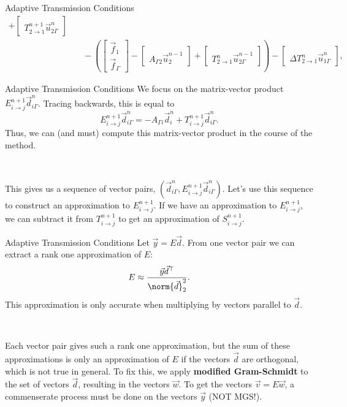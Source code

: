 \documentclass{beamer}
\begin{document}
\begin{frame}{Adaptive Transmission Conditions}
\begin{align*}
	+ \begin{bmatrix} ~ \\ T_{2 \to 1}^{n+1} \vec{u}_{2 \Gamma}^n \end{bmatrix} \\
	& \quad - \left ( \begin{bmatrix} \vec{f}_1 \\ \vec{f}_\Gamma \end{bmatrix}
	- \begin{bmatrix} ~ \\ A_{\Gamma 2} \vec{u}_2^{n-1} \end{bmatrix}
	+ \begin{bmatrix} ~ \\ T_{2 \to 1}^n \vec{u}_{2 \Gamma}^{n-1} \end{bmatrix} \right )
	- \begin{bmatrix} ~ \\ \Delta T_{2 \to 1}^n \vec{u}_{1 \Gamma}^{n} \end{bmatrix},
\end{align*}
\end{frame}

\begin{frame}{Adaptive Transmission Conditions}
We focus on the matrix-vector product $E_{i \to j}^{n+1} \vec{d}_{i \Gamma}^n$.
Tracing backwards, this is equal to
\begin{equation*}
	E_{i \to j}^{n+1} \vec{d}_{i \Gamma}^n = -A_{\Gamma i} \vec{d}_i^n + T_{i \to j}^{n+1} \vec{d}_{i \Gamma}^n.
\end{equation*}
Thus, we can (and must) compute this matrix-vector product in the course of the method.

~

This gives us a sequence of vector pairs, $(\vec{d}_{i \Gamma}^n, E_{i \to j}^{n+1} \vec{d}_{i \Gamma}^n)$.
Let's use this sequence to construct an approximation to $E_{i \to j}^{n+1}$.
If we have an approximation to $E_{i \to j}^{n+1}$, we can subtract it from $T_{i \to j}^{n+1}$ to get an approximation of $S_{i \to j}^{n+1}$.
\end{frame}

\begin{frame}{Adaptive Transmission Conditions}
Let $\vec{y} = E \vec{d}$.
From one vector pair we can extract a rank one approximation of $E$:
\begin{equation*}
	E \approx \frac{\vec{y} \vec{d}^\top}{\norm{\vec{d}}_2^2}.
\end{equation*}
This approximation is only accurate when multiplying by vectors parallel to $\vec{d}$.

~

Each vector pair gives such a rank one approximation, but the sum of these approximations is only an approximation of $E$ if the vectors $\vec{d}$ are orthogonal, which is not true in general.
To fix this, we apply \textbf{modified Gram-Schmidt} to the set of vectors $\vec{d}$, resulting in the vectors $\vec{w}$.
To get the vectors $\vec{v}=E \vec{w}$, a commenserate process must be done on the vectors $\vec{y}$ (NOT MGS!).
\end{frame}
\end{document}
